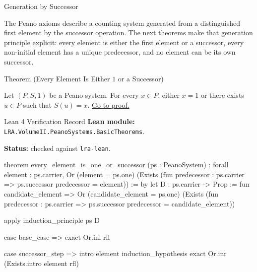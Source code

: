 \begin{topicbox}{Generation by Successor}
\begin{exposition}
The Peano axioms describe a counting system generated from a distinguished
first element by the successor operation. The next theorems make that
generation principle explicit: every element is either the first element or a
successor, every non-initial element has a unique predecessor, and no element
can be its own successor.
\end{exposition}

\begin{theorembox}{Theorem (Every Element Is Either \texorpdfstring{$1$}{1} or a Successor)}
\begin{theorem}
\label{thm:every-element-is-one-or-a-successor}
Let $(P,S,1)$ be a Peano system. For every $x \in P$, either $x=1$ or there
exists $u \in P$ such that $S(u)=x$.
\hyperref[prf:every-element-is-one-or-a-successor]{Go to proof.}
\end{theorem}
\end{theorembox}

\begin{formalizationrecord}{Lean 4 Verification Record}
\textbf{Lean module:} \texttt{LRA.VolumeII.PeanoSystems.BasicTheorems}.\par
{}
\textbf{Status:} checked against \texttt{lra-lean}.\par

\begin{leancode}
theorem every_element_is_one_or_successor
    (ps : PeanoSystem) :
    forall element : ps.carrier,
      Or (element = ps.one)
        (Exists (fun predecessor : ps.carrier =>
          ps.successor predecessor = element)) := by
  let D : ps.carrier -> Prop :=
    fun candidate_element =>
      Or (candidate_element = ps.one)
        (Exists (fun predecessor : ps.carrier =>
          ps.successor predecessor = candidate_element))

  apply induction_principle ps D

  case base_case =>
    exact Or.inl rfl

  case successor_step =>
    intro element induction_hypothesis
    exact Or.inr (Exists.intro element rfl)
\end{leancode}
\end{formalizationrecord}


\end{topicbox}
